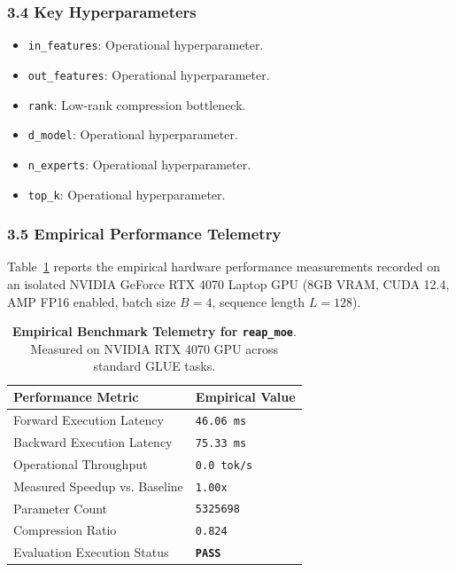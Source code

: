 \subsubsection*{3.4 Key Hyperparameters}
\begin{itemize}
    \item \texttt{in\_features}: Operational hyperparameter.
    \item \texttt{out\_features}: Operational hyperparameter.
    \item \texttt{rank}: Low-rank compression bottleneck.
    \item \texttt{d\_model}: Operational hyperparameter.
    \item \texttt{n\_experts}: Operational hyperparameter.
    \item \texttt{top\_k}: Operational hyperparameter.
\end{itemize}

\subsubsection*{3.5 Empirical Performance Telemetry}
Table~\ref{tab:telemetry_reap\_moe} reports the empirical hardware performance measurements recorded on an isolated NVIDIA GeForce RTX 4070 Laptop GPU (8GB VRAM, CUDA 12.4, AMP FP16 enabled, batch size $B=4$, sequence length $L=128$).

\begin{table}[h]
\centering
\small
\caption{\textbf{Empirical Benchmark Telemetry for \texttt{reap\_moe}}. Measured on NVIDIA RTX 4070 GPU across standard GLUE tasks.}
\label{tab:telemetry_reap\_moe}
\begin{tabularx}{\columnwidth}{lX}
\toprule
\textbf{Performance Metric} & \textbf{Empirical Value} \\
\midrule
Forward Execution Latency & \texttt{46.06 ms} \\
Backward Execution Latency & \texttt{75.33 ms} \\
Operational Throughput & \texttt{0.0 tok/s} \\
Measured Speedup vs. Baseline & \texttt{1.00x} \\
Parameter Count & \texttt{5325698} \\
Compression Ratio & \texttt{0.824} \\
Evaluation Execution Status & \textbf{\texttt{PASS}} \\
\bottomrule
\end{tabularx}
\end{table}

